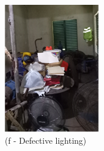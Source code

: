 \begin{figure}[!h]
\begin{minipage}[b]{0.22\linewidth}
		\includegraphics[width=\textwidth]{figures/fig_ch04_fdas_defectivelighting}
		\caption*{(f - Defective lighting)}
	\end{minipage}
	\hspace{0.03cm}
	\begin{minipage}[b]{0.22\linewidth}

\end{minipage}
\end{figure}
